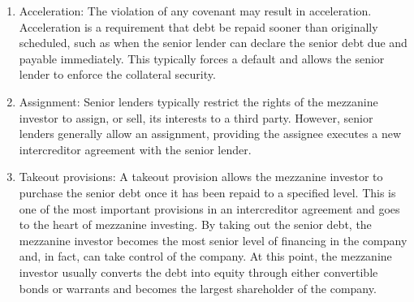\documentclass[11pt]{article}
\begin{document}
\begin{enumerate}
  \item Acceleration: The violation of any covenant may result in acceleration. Acceleration is a requirement that debt be repaid sooner than originally scheduled, such as when the senior lender can declare the senior debt due and payable immediately. This typically forces a default and allows the senior lender to enforce the collateral security.

  \item Assignment: Senior lenders typically restrict the rights of the mezzanine investor to assign, or sell, its interests to a third party. However, senior lenders generally allow an assignment, providing the assignee executes a new intercreditor agreement with the senior lender.

  \item Takeout provisions: A takeout provision allows the mezzanine investor to purchase the senior debt once it has been repaid to a specified level. This is one of the most important provisions in an intercreditor agreement and goes to the heart of mezzanine investing. By taking out the senior debt, the mezzanine investor becomes the most senior level of financing in the company and, in fact, can take control of the company. At this point, the mezzanine investor usually converts the debt into equity through either convertible bonds or warrants and becomes the largest shareholder of the company.

\end{enumerate}
\end{document}
